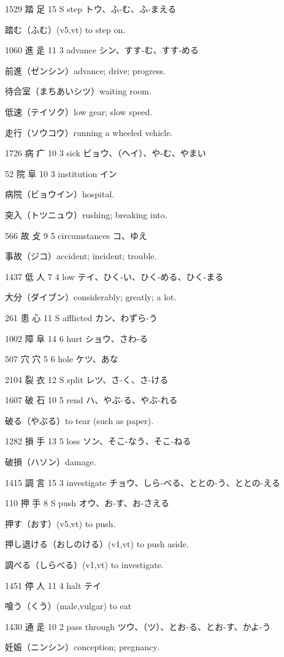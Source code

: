 1529	踏		足	15	S		step	トウ、ふ-む、ふ-まえる

踏む（ふむ）(v5,vt) to step on.

1060	進		辵	11	3		advance	シン、すす-む、すす-める

前進（ゼンシン）advance; drive; progress.

待合室（まちあいシツ）waiting room.

低速（テイソク）low gear; slow speed.

走行（ソウコウ）running a wheeled vehicle.

1726	病		疒	10	3		sick	ビョウ、（ヘイ）、や-む、やまい

52	院		阜	10	3		institution	イン

病院（ビョウイン）hospital.

突入（トツニュウ）rushing; breaking into.

566	故		攴	9	5		circumstances	コ、ゆえ

事故（ジコ）accident; incident; trouble.

1437	低		人	7	4		low	テイ、ひく-い、ひく-める、ひく-まる

大分（ダイブン）considerably; greatly; a lot.

261	患		心	11	S		afflicted	カン、わずら-う

1002	障		阜	14	6		hurt	ショウ、さわ-る

507	穴		穴	5	6		hole	ケツ、あな

2104	裂		衣	12	S		split	レツ、さ-く、さ-ける

1607	破		石	10	5		rend	ハ、やぶ-る、やぶ-れる

破る（やぶる）to tear (such as paper).

1282	損		手	13	5		loss	ソン、そこ-なう、そこ-ねる

破損（ハソン）damage.

1415	調		言	15	3		investigate	チョウ、しら-べる、ととの-う、ととの-える

110	押		手	8	S		push	オウ、お-す、お-さえる

押す（おす）(v5,vt) to push.

押し退ける（おしのける）(v1,vt) to push aside.

調べる（しらべる）(v1,vt) to investigate.

1451	停		人	11	4		halt	テイ

喰う（くう）(male,vulgar) to eat

1430	通		辵	10	2		pass through	ツウ、（ツ）、とお-る、とお-す、かよ-う

妊娠（ニンシン）conception; pregnancy.

